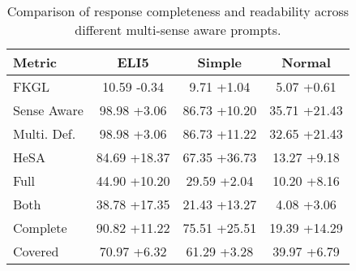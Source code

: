\documentclass{article}%
\begin{document}
%
\normalsize%


\begin{table}[h!]%
\centering%
\small%
\setlength{\tabcolsep}{4pt}%
\begin{tabular}{@{}l c c c@{}}%
\toprule%
\textbf{Metric}&\textbf{ELI5}&\textbf{Simple}&\textbf{Normal}\\%
\midrule%
FKGL&10.59 \textcolor{own_red}{-0.34}&9.71 \textcolor{own_green}{+1.04}&5.07 \textcolor{own_green}{+0.61}\\%
Sense Aware&98.98 \textcolor{own_green}{+3.06}&86.73 \textcolor{own_green}{+10.20}&35.71 \textcolor{own_green}{+21.43}\\%
Multi. Def.&98.98 \textcolor{own_green}{+3.06}&86.73 \textcolor{own_green}{+11.22}&32.65 \textcolor{own_green}{+21.43}\\%
HeSA&84.69 \textcolor{own_green}{+18.37}&67.35 \textcolor{own_green}{+36.73}&13.27 \textcolor{own_green}{+9.18}\\%
Full&44.90 \textcolor{own_green}{+10.20}&29.59 \textcolor{own_green}{+2.04}&10.20 \textcolor{own_green}{+8.16}\\%
Both&38.78 \textcolor{own_green}{+17.35}&21.43 \textcolor{own_green}{+13.27}&4.08 \textcolor{own_green}{+3.06}\\%
Complete&90.82 \textcolor{own_green}{+11.22}&75.51 \textcolor{own_green}{+25.51}&19.39 \textcolor{own_green}{+14.29}\\%
Covered&70.97 \textcolor{own_green}{+6.32}&61.29 \textcolor{own_green}{+3.28}&39.97 \textcolor{own_green}{+6.79}\\\bottomrule%
%
\end{tabular}%
\caption{Comparison of response completeness and readability across different multi{-}sense aware prompts.}%
\end{table}

%
\end{document}
